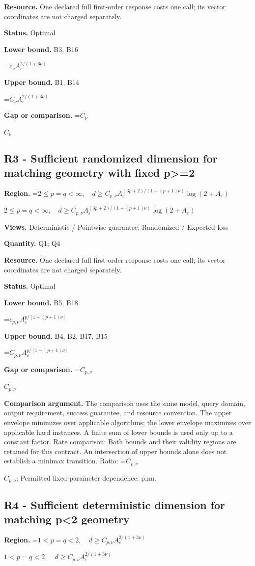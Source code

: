 \documentclass[10pt,a4paper]{article}
\newcommand{\AtlasMath}[1]{\par\begingroup\centering\setbox0=\hbox{$\displaystyle #1$}\ifdim\wd0>1.4\linewidth\typeout{ATLAS WIDE FORMULA: \the\wd0}\fi\ifdim\wd0>\linewidth\resizebox{\linewidth}{!}{\box0}\else\box0\fi\par\endgroup}
\newcommand{\AtlasInlineMath}[1]{\begingroup\setbox0=\hbox{$#1$}\ifdim\wd0>.4\linewidth\endgroup\AtlasMath{#1}\else\endgroup$#1$\fi}
\begin{document}
\textbf{Resource.} One declared full first-order response costs one call; its vector coordinates are not charged separately.

\textbf{Status.} Optimal

\textbf{Lower bound.} B3, B16

\AtlasMath{c_\nu A_\varepsilon^{2/(1+3\nu)}}
\textbf{Upper bound.} B1, B14

\AtlasMath{C_\nu A_\varepsilon^{2/(1+3\nu)}}
\textbf{Gap or comparison.} \AtlasInlineMath{C_\nu}

\subsection{R3 - Sufficient randomized dimension for matching geometry with fixed p>=2}
\textbf{Region.} \AtlasInlineMath{2\le p=q<\infty,\quad d\ge C_{p,\nu}A_\varepsilon^{(3p+2)/(1+(p+1)\nu)}\log(2+A_\varepsilon)}

\textbf{Views.} Deterministic / Pointwise guarantee; Randomized / Expected loss

\textbf{Quantity.} Q1; Q4

\textbf{Resource.} One declared full first-order response costs one call; its vector coordinates are not charged separately.

\textbf{Status.} Optimal

\textbf{Lower bound.} B5, B18

\AtlasMath{c_{p,\nu}A_\varepsilon^{p/[1+(p+1)\nu]}}
\textbf{Upper bound.} B4, B2, B17, B15

\AtlasMath{C_{p,\nu}A_\varepsilon^{p/[1+(p+1)\nu]}}
\textbf{Gap or comparison.} \AtlasInlineMath{C_{p,\nu}}

\textbf{Comparison argument.} The comparison uses the same model, query domain, output requirement, success guarantee, and resource convention. The upper envelope minimizes over applicable algorithms; the lower envelope maximizes over applicable hard instances. A finite sum of lower bounds is used only up to a constant factor. Rate comparison: Both bounds and their validity regions are retained for this contract. An intersection of upper bounds alone does not establish a minimax transition. Ratio: \AtlasInlineMath{C_{p,\nu}}; Permitted fixed-parameter dependence: p,nu.

\subsection{R4 - Sufficient deterministic dimension for matching p<2 geometry}
\textbf{Region.} \AtlasInlineMath{1<p=q<2,\quad d\ge C_{p,\nu}A_\varepsilon^{2/(1+3\nu)}}
\end{document}
